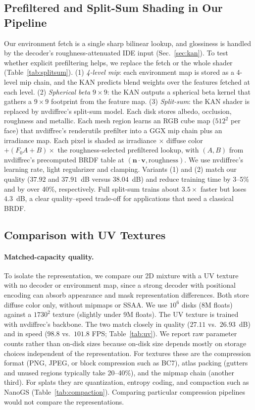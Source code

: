 \begin{addblock}
\subsection{Prefiltered and Split-Sum Shading in Our Pipeline}
\label{app:splitsum}
Our environment fetch is a single sharp bilinear lookup, and glossiness is handled by the decoder's
roughness-attenuated IDE input (Sec.~\ref{sec:kan}). To test whether explicit prefiltering helps, we
replace the fetch or the whole shader (Table~\ref{tab:splitsum}).
(1) \emph{4-level mip}: each environment map is stored as a 4-level mip chain, and the KAN predicts
blend weights over the features fetched at each level.
(2) \emph{Spherical beta $9{\times}9$}: the KAN outputs a spherical beta kernel that gathers a
$9{\times}9$ footprint from the feature map.
(3) \emph{Split-sum}: the KAN shader is replaced by nvdiffrec's split-sum model. Each disk stores
albedo, occlusion, roughness and metallic. Each mesh region learns an RGB cube map ($512^2$ per face)
that nvdiffrec's renderutils prefilter into a GGX mip chain plus an irradiance map. Each pixel is
shaded as irradiance $\times$ diffuse color $+ (F_0A+B)\times$ the roughness-selected prefiltered
lookup, with $(A,B)$ from nvdiffrec's precomputed BRDF table at $(\mathbf{n}\cdot\mathbf{v},
\text{roughness})$. We use nvdiffrec's learning rate, light regularizer and clamping.
Variants (1) and (2) match our quality ($37.92$ and $37.91$~dB versus $38.04$~dB) and reduce training
time by 3--5\% and by over 40\%, respectively. Full split-sum trains about $3.5\times$ faster but
loses $4.3$~dB, a clear quality--speed trade-off for applications that need a classical BRDF.

\subsection{Comparison with UV Textures}
\label{app:uv}
\paragraph{Matched-capacity quality.} To isolate the representation, we compare our 2D mixture with a
UV texture with no decoder or environment map, since a strong decoder with positional encoding can
absorb appearance and mask representation differences. Both store diffuse color only, without mipmaps
or SSAA. We use $10^6$ disks (8M floats) against a $1730^2$ texture (slightly under 9M floats). The
UV texture is trained with nvdiffrec's backbone. The two match closely in quality ($27.11$ vs.\
$26.93$~dB) and in speed ($98.8$ vs.\ $101.8$ FPS; Table~\ref{tab:uv}). We report raw parameter counts
rather than on-disk sizes because on-disk size depends mostly on storage choices independent of the
representation. For textures these are the compression format (PNG, JPEG, or block compression such
as BC7), atlas packing (gutters and unused regions typically take 20--40\%), and the mipmap chain
(another third). For splats they are quantization, entropy coding, and compaction such as
NanoGS (Table~\ref{tab:compaction}). Comparing particular compression pipelines would not compare the
representations.


\end{addblock}

